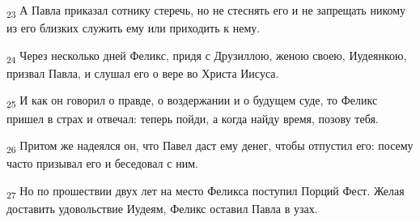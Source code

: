 \begin{tcolorbox}
\textsubscript{23} А Павла приказал сотнику стеречь, но не стеснять его и не запрещать никому из его близких служить ему или приходить к нему.
\end{tcolorbox}
\begin{tcolorbox}
\textsubscript{24} Через несколько дней Феликс, придя с Друзиллою, женою своею, Иудеянкою, призвал Павла, и слушал его о вере во Христа Иисуса.
\end{tcolorbox}
\begin{tcolorbox}
\textsubscript{25} И как он говорил о правде, о воздержании и о будущем суде, то Феликс пришел в страх и отвечал: теперь пойди, а когда найду время, позову тебя.
\end{tcolorbox}
\begin{tcolorbox}
\textsubscript{26} Притом же надеялся он, что Павел даст ему денег, чтобы отпустил его: посему часто призывал его и беседовал с ним.
\end{tcolorbox}
\begin{tcolorbox}
\textsubscript{27} Но по прошествии двух лет на место Феликса поступил Порций Фест. Желая доставить удовольствие Иудеям, Феликс оставил Павла в узах.
\end{tcolorbox}
